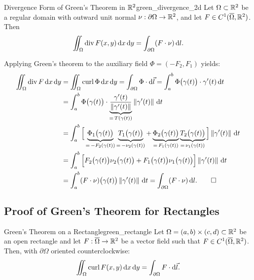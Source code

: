 \begin{proposition}{Divergence Form of Green's Theorem in $\mathbb{R}^2$}{green_divergence_2d}
Let $\Omega \subset \mathbb{R}^2$ be a regular domain with outward unit normal $\nu : \partial\Omega \to \mathbb{R}^2$, and let $F \in C^1(\overline{\Omega}, \mathbb{R}^2)$. Then
\[
    \iint_{\Omega} \operatorname{div} F(x,y) \,\mathrm{d}x\,\mathrm{d}y = \int_{\partial\Omega} (F \cdot \nu) \,\mathrm{d} l.
\]
\end{proposition}

\begin{demonstration}
Applying Green's theorem to the auxiliary field $\Phi = (-F_2, F_1)$ yields:
\begin{align*}
    \iint_{\Omega} \operatorname{div} F \,\mathrm{d}x\,\mathrm{d}y &= \iint_{\Omega} \operatorname{curl} \Phi \,\mathrm{d}x\,\mathrm{d}y = \int_{\partial\Omega} \Phi \cdot \mathrm{d}\vec{l} = \int_{a}^{b} \Phi\big(\gamma(t)\big) \cdot \gamma'(t) \,\mathrm{d}t \\
    &= \int_{a}^{b} \Phi\big(\gamma(t)\big) \cdot \underbrace{\frac{\gamma'(t)}{\left\lVert\gamma'(t)\right\rVert}}_{=\,T(\gamma(t))} \left\lVert\gamma'(t)\right\rVert \,\mathrm{d}t \\
    &= \int_{a}^{b} \Big[ \underbrace{\Phi_1\big(\gamma(t)\big)}_{=\,-F_2(\gamma(t))} \underbrace{T_1\big(\gamma(t)\big)}_{=\,-\nu_2(\gamma(t))} + \underbrace{\Phi_2\big(\gamma(t)\big)}_{=\,F_1(\gamma(t))} \underbrace{T_2\big(\gamma(t)\big)}_{=\,\nu_1(\gamma(t))} \Big] \left\lVert\gamma'(t)\right\rVert \,\mathrm{d}t \\
    &= \int_{a}^{b} \Big[ F_2\big(\gamma(t)\big) \nu_2\big(\gamma(t)\big) + F_1\big(\gamma(t)\big) \nu_1\big(\gamma(t)\big) \Big] \left\lVert\gamma'(t)\right\rVert \,\mathrm{d}t \\
    &= \int_{a}^{b} (F \cdot \nu)\big(\gamma(t)\big) \left\lVert\gamma'(t)\right\rVert \,\mathrm{d}t = \int_{\partial\Omega} (F \cdot \nu) \,\mathrm{d} l. \qedhere
\end{align*}
\end{demonstration}

\subsection{Proof of Green's Theorem for Rectangles}

\begin{theoreme}{Green's Theorem on a Rectangle}{green_rectangle}
Let $\Omega = (a,b) \times (c,d) \subset \mathbb{R}^2$ be an open rectangle and let $F : \overline{\Omega} \to \mathbb{R}^2$ be a vector field such that $F \in C^1(\overline{\Omega}, \mathbb{R}^2)$. Then, with $\partial\Omega$ oriented counterclockwise:
\[
    \iint_{\Omega} \operatorname{curl} F(x,y) \,\mathrm{d}x\,\mathrm{d}y = \int_{\partial\Omega} F \cdot \mathrm{d}\vec{l}.
\]
\end{theoreme}

